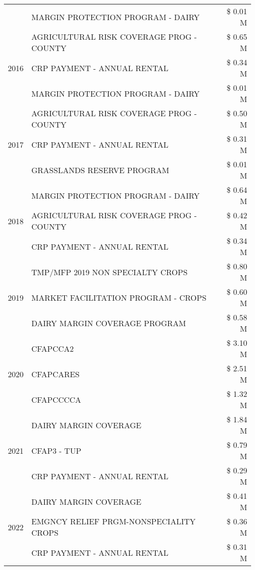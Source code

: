 \begin{tabular}{llr}
 & MARGIN PROTECTION PROGRAM - DAIRY & \$ 0.01 M \\
\cline{1-3}
\multirow[t]{3}{*}{2016} & AGRICULTURAL RISK COVERAGE PROG - COUNTY & \$ 0.65 M \\
 & CRP PAYMENT - ANNUAL RENTAL & \$ 0.34 M \\
 & MARGIN PROTECTION PROGRAM - DAIRY & \$ 0.01 M \\
\cline{1-3}
\multirow[t]{3}{*}{2017} & AGRICULTURAL RISK COVERAGE PROG - COUNTY & \$ 0.50 M \\
 & CRP PAYMENT - ANNUAL RENTAL & \$ 0.31 M \\
 & GRASSLANDS RESERVE PROGRAM & \$ 0.01 M \\
\cline{1-3}
\multirow[t]{3}{*}{2018} & MARGIN PROTECTION PROGRAM - DAIRY & \$ 0.64 M \\
 & AGRICULTURAL RISK COVERAGE PROG - COUNTY & \$ 0.42 M \\
 & CRP PAYMENT - ANNUAL RENTAL & \$ 0.34 M \\
\cline{1-3}
\multirow[t]{3}{*}{2019} & TMP/MFP 2019 NON SPECIALTY CROPS & \$ 0.80 M \\
 & MARKET FACILITATION PROGRAM - CROPS & \$ 0.60 M \\
 & DAIRY MARGIN COVERAGE PROGRAM & \$ 0.58 M \\
\cline{1-3}
\multirow[t]{3}{*}{2020} & CFAPCCA2 & \$ 3.10 M \\
 & CFAPCARES & \$ 2.51 M \\
 & CFAPCCCCA & \$ 1.32 M \\
\cline{1-3}
\multirow[t]{3}{*}{2021} & DAIRY MARGIN COVERAGE & \$ 1.84 M \\
 & CFAP3 - TUP & \$ 0.79 M \\
 & CRP PAYMENT - ANNUAL RENTAL & \$ 0.29 M \\
\cline{1-3}
\multirow[t]{3}{*}{2022} & DAIRY MARGIN COVERAGE & \$ 0.41 M \\
 & EMGNCY RELIEF PRGM-NONSPECIALITY CROPS & \$ 0.36 M \\
 & CRP PAYMENT - ANNUAL RENTAL & \$ 0.31 M \\
\cline{1-3}
\bottomrule
\end{tabular}
